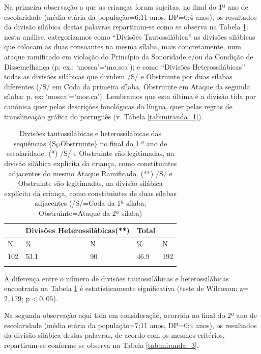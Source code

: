 \documentclass[output=paper]{LSP/langsci}
\begin{document}
Na primeira observação a que as crianças foram sujeitas, no final do 1º ano de escolaridade (média etária da população=6;11 anos, DP=0;4 anos), os resultados da divisão silábica destas palavras repartiram-se como se observa na Tabela \ref{tab:miranda_2}: nesta análise, categorizamos como ``Divisões Tautossilábica'' as divisões silábicas que colocam as duas consoantes na mesma sílaba, mais concretamente, num ataque ramificado em violação do Princípio da Sonoridade e/ou da Condição de Dissemelhança (p. ex.: `mosca'=`mo.sca'); e como ``Divisões Heterossilábicas'' todas as divisões silábicas que dividem /S/ e Obstruinte por duas sílabas diferentes (/S/ em Coda da primeira sílaba, Obstruinte em Ataque da segunda sílaba: p. ex: `mosca'=`mos.ca'). Lembramos que esta última é a divisão tida por canónica quer pelas descrições fonológicas da língua, quer pelas regras de translineação gráfica do português (v. Tabela \ref{tab:miranda_1}).

\begin{table}[h]
\begin{tabular}{lllll}
\lsptoprule
\multicolumn{2}{l}{Divisões Tautosilábicas(*)} & \multicolumn{2}{l}{Divisões Heterossilábicas(**)} & Total \\
\midrule
N                    & \%                   & N                    & \%                     & N     \\
102                  & 53.1                 & 90                   & 46.9                   & 192  \\
\lspbottomrule
\end{tabular}
\caption{Divisões tautossilábicas e heterossilábicas das sequências \{S$\wp$Obstruinte\} no final do 1.º ano de escolaridade. (*) /S/ e Obstruinte são legitimadas, na divisão silábica explícita da criança, como constituintes adjacentes do mesmo Ataque Ramificado. (**) /S/ e Obstruinte são legitimadas, na divisão silábica explícita da criança, como constituintes de duas sílabas adjacentes (/S/=Coda da 1ª sílaba; Obstruinte=Ataque da 2ª sílaba)}
\label{tab:miranda_2}
\end{table}

A diferença entre o número de divisões tautossilábicas e heterossilábicas encontrada na Tabela \ref{tab:miranda_2} é estatisticamente significativa (teste de Wilcoxon: z=$2,179$; p$<0,05$).

Na segunda observação aqui tida em consideração, ocorrida no final do 2º ano de escolaridade (média etária da população=7;11 anos, DP=0;4 anos), os resultados da divisão silábica destas palavras, de acordo com os mesmos critérios, repartiram-se conforme se observa na Tabela \ref{tab:miranda_3}.
\end{document}
